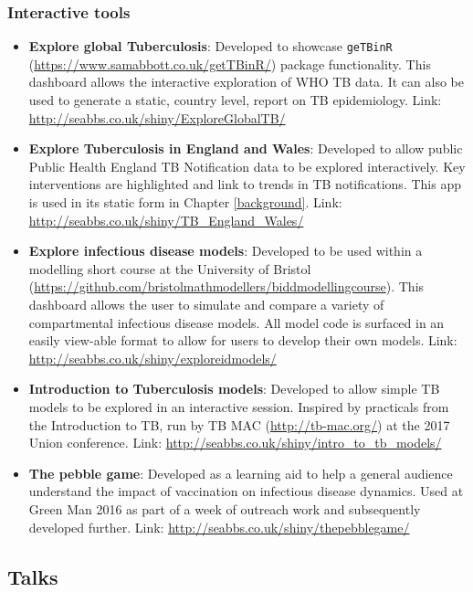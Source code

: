 \documentclass[11pt,twoside]{bristolthesis}
\begin{document}
  \hypertarget{interactive-tools}{%
  \subsubsection{Interactive tools}\label{interactive-tools}}
  \begin{itemize}
  \item
    \textbf{Explore global Tuberculosis}: Developed to showcase \texttt{geTBinR} (\url{https://www.samabbott.co.uk/getTBinR/}) package functionality. This dashboard allows the interactive exploration of WHO TB data. It can also be used to generate a static, country level, report on TB epidemiology. Link: \url{http://seabbs.co.uk/shiny/ExploreGlobalTB/}
  \item
    \textbf{Explore Tuberculosis in England and Wales}: Developed to allow public Public Health England TB Notification data to be explored interactively. Key interventions are highlighted and link to trends in TB notifications. This app is used in its static form in Chapter \ref{background}. Link: \url{http://seabbs.co.uk/shiny/TB_England_Wales/}
  \item
    \textbf{Explore infectious disease models}: Developed to be used within a modelling short course at the University of Bristol (\url{https://github.com/bristolmathmodellers/biddmodellingcourse}). This dashboard allows the user to simulate and compare a variety of compartmental infectious disease models. All model code is surfaced in an easily view-able format to allow for users to develop their own models. Link: \url{http://seabbs.co.uk/shiny/exploreidmodels/}
  \item
    \textbf{Introduction to Tuberculosis models}: Developed to allow simple TB models to be explored in an interactive session. Inspired by practicals from the Introduction to TB, run by TB MAC (\url{http://tb-mac.org/}) at the 2017 Union conference. Link: \url{http://seabbs.co.uk/shiny/intro_to_tb_models/}
  \item
    \textbf{The pebble game}: Developed as a learning aid to help a general audience understand the impact of vaccination on infectious disease dynamics. Used at Green Man 2016 as part of a week of outreach work and subsequently developed further. Link: \url{http://seabbs.co.uk/shiny/thepebblegame/}
  \end{itemize}
  \hypertarget{talks}{%
  \subsection{Talks}\label{talks}}
\end{document}
